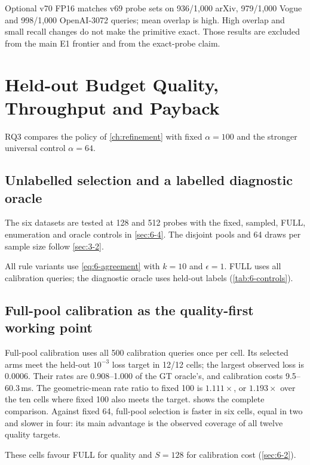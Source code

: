 Optional v70 FP16 matches v69 probe sets on 936/1,000 arXiv, 979/1,000 Vogue and 998/1,000 OpenAI-3072 queries; mean overlap is high. High overlap and small recall changes do not make the
primitive exact. Those results are excluded from the main E1 frontier
and from the exact-probe claim.

\section{Held-out Budget Quality, Throughput and Payback}
\label{sec:7-5}

RQ3 compares the policy of \cref{ch:refinement} with fixed
$\alpha=100$ and the stronger universal control $\alpha=64$.

\subsection{Unlabelled selection and a labelled diagnostic oracle}

The six datasets are tested at 128 and 512 probes with the fixed,
sampled, FULL, enumeration and oracle controls in \cref{sec:6-4}.
The disjoint pools and 64 draws per sample size follow \cref{sec:3-2}.


All rule variants use \cref{eq:6-agreement} with $k=10$ and $\epsilon=1$.
FULL uses all calibration queries; the diagnostic oracle uses held-out
labels (\cref{tab:6-controls}).


\subsection{Full-pool calibration as the quality-first working point}

Full-pool calibration uses all 500 calibration queries once per cell.
Its selected arms meet the held-out $10^{-3}$ loss target in 12/12 cells;
the largest observed loss is 0.0006. Their rates are 0.908--1.000 of the
GT oracle's, and calibration costs 9.5--60.3\,ms. The geometric-mean
rate ratio to fixed 100 is $1.111\times$, or $1.193\times$ over the ten
cells where fixed 100 also meets the target. 
shows the complete comparison. Against fixed 64, full-pool selection is
faster in six cells, equal in two and slower in four: its main advantage
is the observed coverage of all twelve quality targets.

These cells favour FULL for quality and $S=128$ for calibration cost (\cref{sec:6-2}).


\begin{table}[tbp]
\centering
\caption[Full-pool budget calibration]{Full-pool calibration ($S=500$). Loss is relative to the best
measured held-out recall; rates are kQPS from the selected fixed arm.
``Cal.'' is one full-pool calibration call per cell, not a repeated
stream timing. Held-out counts are 500, or 499 for Stella.}
\label{tab:7-budget-full}
\footnotesize\setlength{\tabcolsep}{3pt}

\end{table}

